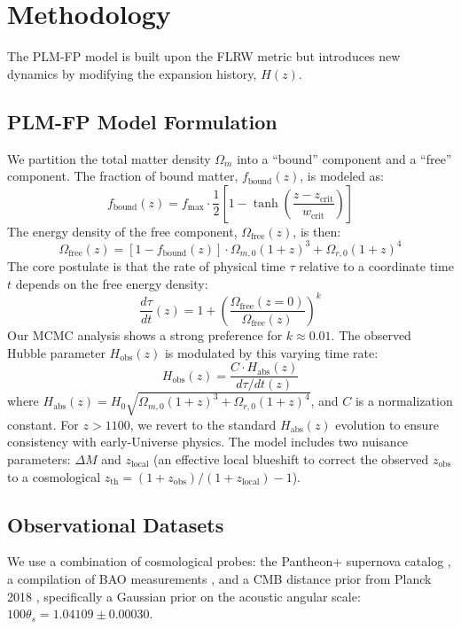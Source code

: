 \documentclass[12pt, a4paper]{article}
\begin{document}
\section{Methodology}
The PLM-FP model is built upon the FLRW metric but introduces new dynamics by modifying the expansion history, $H(z)$.

\subsection{PLM-FP Model Formulation}
We partition the total matter density $\Omega_m$ into a ``bound'' component and a ``free'' component. The fraction of bound matter, $f_{\text{bound}}(z)$, is modeled as:
\begin{equation}
f_{\text{bound}}(z) = f_{\max} \cdot \frac{1}{2} \left[1 - \tanh\left(\frac{z - z_{\text{crit}}}{w_{\text{crit}}}\right)\right]
\end{equation}
The energy density of the free component, $\Omega_{\text{free}}(z)$, is then:
\begin{equation}
\Omega_{\text{free}}(z) = [1 - f_{\text{bound}}(z)] \cdot \Omega_{m,0} (1+z)^3 + \Omega_{r,0} (1+z)^4
\end{equation}
The core postulate is that the rate of physical time $\tau$ relative to a coordinate time $t$ depends on the free energy density:
\begin{equation}
\frac{d\tau}{dt}(z) = 1 + \left( \frac{\Omega_{\text{free}}(z=0)}{\Omega_{\text{free}}(z)} \right)^k
\end{equation}
Our MCMC analysis shows a strong preference for $k \approx 0.01$. The observed Hubble parameter $H_{\text{obs}}(z)$ is modulated by this varying time rate:
\begin{equation}
H_{\text{obs}}(z) = \frac{C \cdot H_{\text{abs}}(z)}{d\tau/dt(z)}
\end{equation}
where $H_{\text{abs}}(z) = H_0 \sqrt{\Omega_{m,0}(1+z)^3 + \Omega_{r,0}(1+z)^4}$, and $C$ is a normalization constant. For $z > 1100$, we revert to the standard $H_{\text{abs}}(z)$ evolution to ensure consistency with early-Universe physics. The model includes two nuisance parameters: $\Delta M$ and $z_{\text{local}}$ (an effective local blueshift to correct the observed $z_{\text{obs}}$ to a cosmological $z_{\text{th}} = (1 + z_{\text{obs}}) / (1 + z_{\text{local}}) - 1$).

\subsection{Observational Datasets}
We use a combination of cosmological probes: the Pantheon+ supernova catalog \cite{PantheonPlus}, a compilation of BAO measurements \cite{BAO_compilation}, and a CMB distance prior from Planck 2018 \cite{Planck2018}, specifically a Gaussian prior on the acoustic angular scale: $100 \theta_s = 1.04109 \pm 0.00030$.
\end{document}
